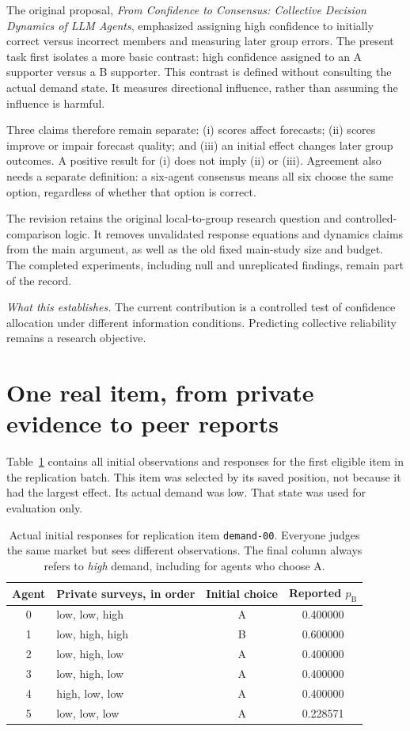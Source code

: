 \documentclass[11pt]{article}
\newcommand{\takeaway}[1]{\par\smallskip\noindent\textit{What this establishes.} #1\par\medskip}
\newcommand{\pB}{p_{\mathrm B}}
\begin{document}
The original proposal, \emph{From Confidence to Consensus: Collective Decision Dynamics of LLM Agents}, emphasized assigning high confidence to initially correct versus incorrect members and measuring later group errors. The present task first isolates a more basic contrast: high confidence assigned to an A supporter versus a B supporter. This contrast is defined without consulting the actual demand state. It measures directional influence, rather than assuming the influence is harmful.

Three claims therefore remain separate: (i) scores affect forecasts; (ii) scores improve or impair forecast quality; and (iii) an initial effect changes later group outcomes. A positive result for (i) does not imply (ii) or (iii). Agreement also needs a separate definition: a six-agent consensus means all six choose the same option, regardless of whether that option is correct.

The revision retains the original local-to-group research question and controlled-comparison logic. It removes unvalidated response equations and dynamics claims from the main argument, as well as the old fixed main-study size and budget. The completed experiments, including null and unreplicated findings, remain part of the record.

\takeaway{The current contribution is a controlled test of confidence allocation under different information conditions. Predicting collective reliability remains a research objective.}

\section{One real item, from private evidence to peer reports}
\label{sec:example}
Table~\ref{tab:initial} contains all initial observations and responses for the first eligible item in the replication batch. This item was selected by its saved position, not because it had the largest effect. Its actual demand was low. That state was used for evaluation only.

\begin{table}[htbp]\centering\small
\begin{tabular}{@{}clcc@{}}\toprule
Agent & Private surveys, in order & Initial choice & Reported $\pB$ \\\midrule
0 & low, low, high & A & 0.400000 \\
1 & low, high, high & B & 0.600000 \\
2 & low, high, low & A & 0.400000 \\
3 & low, high, low & A & 0.400000 \\
4 & high, low, low & A & 0.400000 \\
5 & low, low, low & A & 0.228571 \\\bottomrule
\end{tabular}
\caption{Actual initial responses for replication item \texttt{demand-00}. Everyone judges the same market but sees different observations. The final column always refers to \emph{high} demand, including for agents who choose A.}
\label{tab:initial}\end{table}
\end{document}
